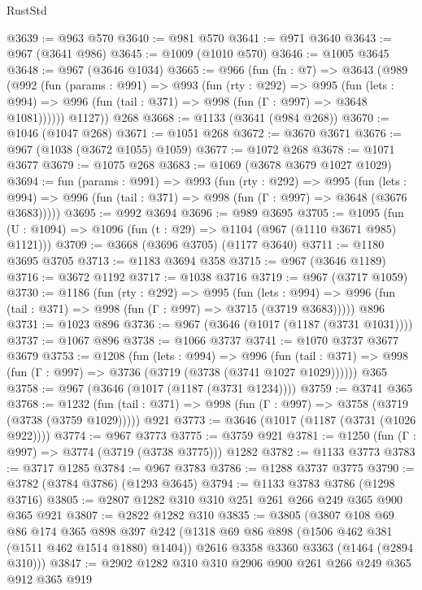 \begin{lexlean}{RustStd}
\begin{coremodule}
@3639 := @963 @570
@3640 := @981 @570
@3641 := @971 @3640
@3643 := @967 (@3641 @986)
@3645 := @1009 (@1010 @570)
@3646 := @1005 @3645
@3648 := @967 (@3646 @1034)
@3665 := @966
    (fun (fn : @7) =>
    @3643
      (@989
        (@992
          (fun (params : @991) =>
          @993
            (fun (rty : @292) =>
            @995
              (fun (lets : @994) =>
              @996 (fun (tail : @371) => @998 (fun (Γ : @997) => @3648 @1081))))))
        @1127))
    @268
@3668 := @1133 (@3641 (@984 @268))
@3670 := @1046 (@1047 @268)
@3671 := @1051 @268
@3672 := @3670 @3671
@3676 := @967 (@1038 (@3672 @1055) @1059)
@3677 := @1072 @268
@3678 := @1071 @3677
@3679 := @1075 @268
@3683 := @1069 (@3678 @3679 @1027 @1029)
@3694 := fun (params : @991) =>
  @993
    (fun (rty : @292) =>
    @995
      (fun (lets : @994) =>
      @996 (fun (tail : @371) => @998 (fun (Γ : @997) => @3648 (@3676 @3683)))))
@3695 := @992 @3694
@3696 := @989 @3695
@3705 := @1095 (fun (U : @1094) => @1096 (fun (t : @29) => @1104 (@967 (@1110 @3671 @985) @1121)))
@3709 := @3668 (@3696 @3705) (@1177 @3640)
@3711 := @1180 @3695 @3705
@3713 := @1183 @3694 @358
@3715 := @967 (@3646 @1189)
@3716 := @3672 @1192
@3717 := @1038 @3716
@3719 := @967 (@3717 @1059)
@3730 := @1186
    (fun (rty : @292) =>
    @995
      (fun (lets : @994) =>
      @996 (fun (tail : @371) => @998 (fun (Γ : @997) => @3715 (@3719 @3683)))))
    @896
@3731 := @1023 @896
@3736 := @967 (@3646 (@1017 (@1187 (@3731 @1031))))
@3737 := @1067 @896
@3738 := @1066 @3737
@3741 := @1070 @3737 @3677 @3679
@3753 := @1208
    (fun (lets : @994) =>
    @996 (fun (tail : @371) => @998 (fun (Γ : @997) => @3736 (@3719 (@3738 (@3741 @1027 @1029))))))
    @365
@3758 := @967 (@3646 (@1017 (@1187 (@3731 @1234))))
@3759 := @3741 @365
@3768 := @1232
    (fun (tail : @371) => @998 (fun (Γ : @997) => @3758 (@3719 (@3738 (@3759 @1029)))))
    @921
@3773 := @3646 (@1017 (@1187 (@3731 (@1026 @922))))
@3774 := @967 @3773
@3775 := @3759 @921
@3781 := @1250 (fun (Γ : @997) => @3774 (@3719 (@3738 @3775))) @1282
@3782 := @1133 @3773
@3783 := @3717 @1285
@3784 := @967 @3783
@3786 := @1288 @3737 @3775
@3790 := @3782 (@3784 @3786) (@1293 @3645)
@3794 := @1133 @3783 @3786 (@1298 @3716)
@3805 := @2807 @1282 @310 @310 @251 @261 @266 @249 @365 @900 @365 @921
@3807 := @2822 @1282 @310
@3835 := @3805
    (@3807
      @108
      @69
      @86
      @174
      @365
      @898
      @397
      @242
      (@1318 @69 @86 @898 (@1506 @462 @381 (@1511 @462 @1514 @1880) @1404))
      @2616
      @3358
      @3360
      @3363
      (@1464 (@2894 @310)))
@3847 := @2902 @1282 @310 @310 @2906 @900 @261 @266 @249 @365 @912 @365 @919

\end{coremodule}
\end{lexlean}
